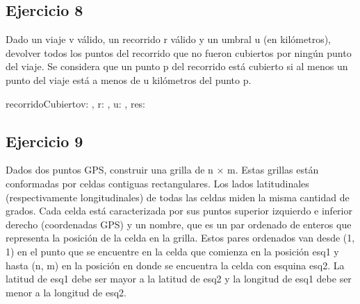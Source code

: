 \documentclass[a4paper]{article}
\begin{document}
\pagebreak

\subsection{Ejercicio 8}

Dado un viaje v válido, un recorrido r válido y un umbral u (en kilómetros), devolver todos los puntos del recorrido que no fueron
cubiertos por ningún punto del viaje. Se considera que un punto p del recorrido está cubierto si al menos un punto del viaje
está a menos de u kilómetros del punto p.

\begin{proc}{recorridoCubierto}{\In v: \viaje, \In r: \recorrido, \In u: \dist, \Out res: \TLista{\gps}}{}



\end{proc}

\pagebreak

\subsection{Ejercicio 9}

Dados dos puntos GPS, construir una grilla de n × m. Estas grillas están conformadas por celdas contiguas rectangulares. Los
lados latitudinales (respectivamente longitudinales) de todas las celdas miden la misma cantidad de grados. Cada celda está
caracterizada por sus puntos superior izquierdo e inferior derecho (coordenadas GPS) y un nombre, que es un par ordenado
de enteros que representa la posición de la celda en la grilla. Estos pares ordenados van desde (1, 1) en el punto que se
encuentre en la celda que comienza en la posición esq1 y hasta (n, m) en la posición en donde se encuentra la celda con
esquina esq2. La latitud de esq1 debe ser mayor a la latitud de esq2 y la longitud de esq1 debe ser menor a la longitud de
esq2.
\end{document}
